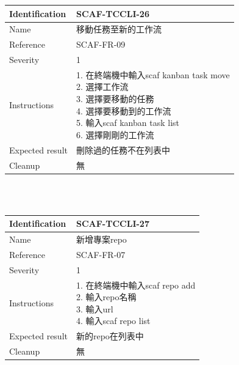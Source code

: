 \documentclass{report}
\begin{document}
\begin{tabularx}{\textwidth}{
  |p{}%
  |p{}|%
  }
  \hline
  \centering Identification &  SCAF-TCCLI-26 \\
  \hline
  \centering Name & 移動任務至新的工作流 \\
  \hline
  \centering Reference & SCAF-FR-09 \\
  \hline
  \centering Severity & 1 \\
  \hline
  \centering Instructions & 
  \makecell[l]{
    1. 在終端機中輸入scaf kanban task move \\
    2. 選擇工作流 \\
    3. 選擇要移動的任務 \\
    4. 選擇要移動到的工作流 \\
    5. 輸入scaf kanban task list \\
    6. 選擇剛剛的工作流 \\
  }\\
  \hline
  \centering Expected result & 刪除過的任務不在列表中 \\
  \hline
  \centering Cleanup & 無 \\
  \hline
\end{tabularx}
\\
\newline
\\

\begin{tabularx}{\textwidth}{
  |p{}%
  |p{}|%
  }
  \hline
  \centering Identification &  SCAF-TCCLI-27 \\
  \hline
  \centering Name & 新增專案repo \\
  \hline
  \centering Reference & SCAF-FR-07 \\
  \hline
  \centering Severity & 1 \\
  \hline
  \centering Instructions & 
  \makecell[l]{
    1. 在終端機中輸入scaf repo add \\
    2. 輸入repo名稱 \\
    3. 輸入url \\
    4. 輸入scaf repo list \\
  }\\
  \hline
  \centering Expected result & 新的repo在列表中 \\
  \hline
  \centering Cleanup & 無 \\
  \hline
\end{tabularx}
\\
\newline
\\
\end{document}
